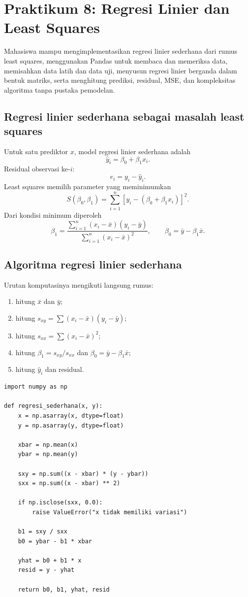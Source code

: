 \documentclass[11pt,a4paper]{report}
\begin{document}
\chapter{Praktikum 8: Regresi Linier dan Least Squares}
\begin{tujuanbox}
Mahasiswa mampu mengimplementasikan regresi linier sederhana dari rumus least squares, menggunakan Pandas untuk membaca dan memeriksa data, memisahkan data latih dan data uji, menyusun regresi linier berganda dalam bentuk matriks, serta menghitung prediksi, residual, MSE, dan kompleksitas algoritma tanpa pustaka pemodelan.
\end{tujuanbox}

\section{Regresi linier sederhana sebagai masalah least squares}
Untuk satu prediktor $x$, model regresi linier sederhana adalah
\[
\hat y_i=\beta_0+\beta_1x_i.
\]
Residual observasi ke-$i$:
\[
e_i=y_i-\hat y_i.
\]
Least squares memilih parameter yang meminimumkan
\[
S(\beta_0,\beta_1)
=
\sum_{i=1}^n
\left[y_i-(\beta_0+\beta_1x_i)\right]^2.
\]
Dari kondisi minimum diperoleh
\[
\beta_1=
\frac{\sum_{i=1}^n(x_i-\bar{x})(y_i-\bar{y})}
{\sum_{i=1}^n(x_i-\bar{x})^2},
\qquad
\beta_0=\bar{y}-\beta_1\bar{x}.
\]

\section{Algoritma regresi linier sederhana}
Urutan komputasinya mengikuti langsung rumus:
\begin{enumerate}
  \item hitung $\bar{x}$ dan $\bar{y}$;
  \item hitung $s_{xy}=\sum(x_i-\bar{x})(y_i-\bar{y})$;
  \item hitung $s_{xx}=\sum(x_i-\bar{x})^2$;
  \item hitung $\beta_1=s_{xy}/s_{xx}$ dan $\beta_0=\bar{y}-\beta_1\bar{x}$;
  \item hitung $\hat y_i$ dan residual.
\end{enumerate}

\begin{lstlisting}
import numpy as np

def regresi_sederhana(x, y):
    x = np.asarray(x, dtype=float)
    y = np.asarray(y, dtype=float)

    xbar = np.mean(x)
    ybar = np.mean(y)

    sxy = np.sum((x - xbar) * (y - ybar))
    sxx = np.sum((x - xbar) ** 2)

    if np.isclose(sxx, 0.0):
        raise ValueError("x tidak memiliki variasi")

    b1 = sxy / sxx
    b0 = ybar - b1 * xbar

    yhat = b0 + b1 * x
    resid = y - yhat

    return b0, b1, yhat, resid
\end{lstlisting}
\end{document}
